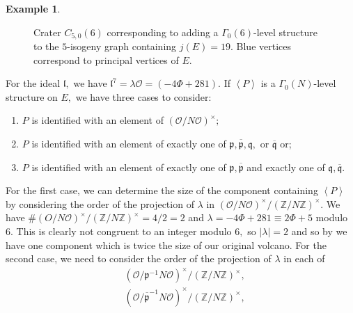 \documentclass[11pt,a4paper]{amsart}
\theoremstyle{plain}
\theoremstyle{definition}
\newtheorem{eg}[thm]{Example}
\theoremstyle{remark}
\begin{document}
\begin{eg}
\begin{figure}
  \caption{Crater $C_{5,0}(6)$ corresponding to adding a $\Gamma_0(6)$-level structure to the $5$-isogeny graph containing $j(E) = 19.$ Blue vertices correspond to principal vertices of $E.$}\label{fig:eg-Gamma0-crater-j19}
\end{figure}For the ideal $\mathfrak{l},$ we have $\mathfrak{l}^7 = \lambda\mathcal{O} = (-4\Phi + 281).$ If $\left\langle P \right\rangle$ is a $\Gamma_0(N)$-level structure on $E,$ we have three cases to consider:
  \begin{enumerate}[label=(\roman*)]
  \item $P$ is identified with an element of $(\mathcal{O}/N\mathcal{O})^{\times};$
  \item $P$ is identified with an element of exactly one of $\mathfrak{p}, \overline{\mathfrak{p}}, \mathfrak{q},$ or $\overline{\mathfrak{q}}$ or;
  \item $P$ is identified with an element of exactly one of $\mathfrak{p}, \overline{\mathfrak{p}}$ and exactly one of $\mathfrak{q}, \overline{\mathfrak{q}}.$
  \end{enumerate}
  For the first case, we can determine the size of the component containing $\left\langle P \right\rangle$ by considering the order of the projection of $\lambda$ in $(\mathcal{O}/N\mathcal{O})^{\times}/(\mathbb{Z}/N \mathbb{Z})^{\times}.$ We have $\#({O}/N\mathcal{O})^{\times}/(\mathbb{Z}/N \mathbb{Z})^{\times} = 4/2 = 2$ and $\lambda = -4\Phi + 281 \equiv 2\Phi + 5$ modulo $6.$ This is clearly not congruent to an integer modulo $6,$ so $\lvert \lambda \rvert= 2$ and so by  we have one component which is twice the size of our original volcano. For the second case, we need to consider the order of the projection of $\lambda$ in each of
  \begin{align*}
    &(\mathcal{O}/\mathfrak{p}^{-1}N\mathcal{O})^{\times}/(\mathbb{Z}/N \mathbb{Z})^{\times}, \\
    &(\mathcal{O}/\overline{\mathfrak{p}}^{-1}N\mathcal{O})^{\times}/(\mathbb{Z}/N \mathbb{Z})^{\times}, \\

\end{align*}
\end{eg}
\end{document}
